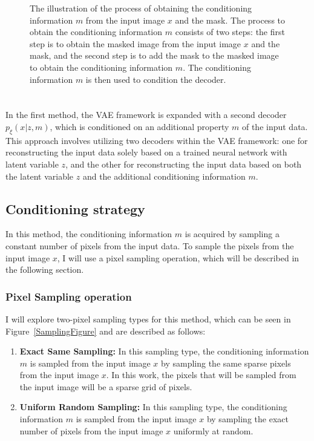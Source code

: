 \begin{figure}
    \centering
    
    \caption[The illustration of the process of obtaining the conditioning information $m$ from the input image $x$ and the mask.]%
    {
        The illustration of the process of obtaining the conditioning information $m$ from the input image $x$ and the mask. The process to obtain the conditioning information $m$ consists of two steps: the first step is to obtain the masked image from the input image $x$ and the mask, and the second step is to add the mask to the masked image to obtain the conditioning information $m$. The conditioning information $m$ is then used to condition the decoder.
    }\label{ConditioningFigure}
\end{figure}

\section{}

In the first method, the VAE framework is expanded with a second decoder
$p_\xi(x|z,m)$, which is conditioned on an additional property $m$ of the input
data. This approach involves utilizing two decoders within the VAE framework:
one for reconstructing the input data solely based on a trained neural network with  latent variable $z$,
and the other for reconstructing the input data based on both the latent
variable $z$ and the additional conditioning information $m$.

\subsection{Conditioning strategy}

In this method, the conditioning information $m$ is acquired by sampling a
constant number of pixels from the input data. To sample the pixels from the
input image $x$, I will use a pixel sampling operation, which will be described
in the following section.

\subsubsection{Pixel Sampling operation}

I will explore two-pixel sampling types for this method,
which can be seen in Figure~\ref{SamplingFigure} and are described as follows:

\begin{enumerate}
    \item \textbf{Exact Same Sampling:} In this sampling type, the conditioning information $m$ is sampled from the input image $x$ by sampling the same sparse pixels from the input image $x$. In this work, the pixels that will be sampled from the input image will be a sparse grid of pixels.
    \item \textbf{Uniform Random Sampling:} In this sampling type, the conditioning information $m$ is sampled from the input image $x$ by sampling the exact number of pixels from the input image $x$ uniformly at random.
\end{enumerate}

